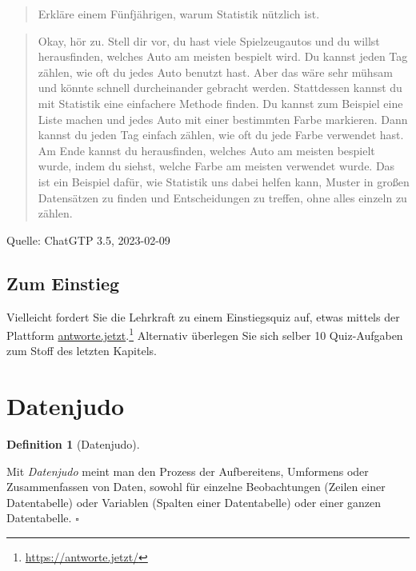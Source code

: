 \documentclass[
  letterpaper,
]{scrbook}
\theoremstyle{definition}
\theoremstyle{definition}
\newtheorem{definition}{Definition}[chapter]
\theoremstyle{definition}
\theoremstyle{remark}
\begin{document}
\begin{quote}
{} Erkläre einem Fünfjährigen, warum Statistik nützlich
ist.
\end{quote}

\begin{quote}
{} Okay, hör zu. Stell dir vor, du hast viele
Spielzeugautos und du willst herausfinden, welches Auto am meisten
bespielt wird. Du kannst jeden Tag zählen, wie oft du jedes Auto benutzt
hast. Aber das wäre sehr mühsam und könnte schnell durcheinander
gebracht werden. Stattdessen kannst du mit Statistik eine einfachere
Methode finden. Du kannst zum Beispiel eine Liste machen und jedes Auto
mit einer bestimmten Farbe markieren. Dann kannst du jeden Tag einfach
zählen, wie oft du jede Farbe verwendet hast. Am Ende kannst du
herausfinden, welches Auto am meisten bespielt wurde, indem du siehst,
welche Farbe am meisten verwendet wurde. Das ist ein Beispiel dafür, wie
Statistik uns dabei helfen kann, Muster in großen Datensätzen zu finden
und Entscheidungen zu treffen, ohne alles einzeln zu zählen.
\end{quote}

Quelle: ChatGTP 3.5, 2023-02-09

\subsection{Zum Einstieg}\label{zum-einstieg}

Vielleicht fordert Sie die Lehrkraft zu einem Einstiegsquiz auf, etwas
mittels der Plattform
\href{https://antworte.jetzt/}{antworte.jetzt}.\footnote{\url{https://antworte.jetzt/}}
Alternativ überlegen Sie sich selber 10 Quiz-Aufgaben zum Stoff des
letzten Kapitels.

\section{Datenjudo}\label{datenjudo}

\begin{definition}[Datenjudo]\protect\hypertarget{def-datenjudo}{}\label{def-datenjudo}

Mit \emph{Datenjudo} meint man den Prozess der Aufbereitens, Umformens
oder Zusammenfassen von Daten, sowohl für einzelne Beobachtungen (Zeilen
einer Datentabelle) oder Variablen (Spalten einer Datentabelle) oder
einer ganzen Datentabelle. \(\square\)

\end{definition}
\end{document}
